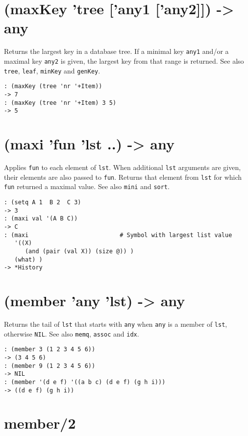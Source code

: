{{{{{{{ 
\section{(maxKey 'tree ['any1 ['any2]]) -> any}
\label{sec-8-1-13-18}


Returns the largest key in a database tree. If a minimal key \texttt{any1}
and/or a maximal key \texttt{any2} is given, the largest key from that range is
returned. See also \texttt{tree}, \texttt{leaf}, \texttt{minKey} and \texttt{genKey}.


\begin{verbatim}
: (maxKey (tree 'nr '+Item))
-> 7
: (maxKey (tree 'nr '+Item) 3 5)
-> 5
\end{verbatim}

 
\section{(maxi 'fun 'lst ..) -> any}
\label{sec-8-1-13-19}


Applies \texttt{fun} to each element of \texttt{lst}. When additional \texttt{lst} arguments
are given, their elements are also passed to \texttt{fun}. Returns that element
from \texttt{lst} for which \texttt{fun} returned a maximal value. See also \texttt{mini} and
\texttt{sort}.


\begin{verbatim}
: (setq A 1  B 2  C 3)
-> 3
: (maxi val '(A B C))
-> C
: (maxi                          # Symbol with largest list value
   '((X)
      (and (pair (val X)) (size @)) )
   (what) )
-> *History
\end{verbatim}

 
\section{(member 'any 'lst) -> any}
\label{sec-8-1-13-20}


Returns the tail of \texttt{lst} that starts with \texttt{any} when \texttt{any} is a member
of \texttt{lst}, otherwise \texttt{NIL}. See also \texttt{memq}, \texttt{assoc} and \texttt{idx}.


\begin{verbatim}
: (member 3 (1 2 3 4 5 6))
-> (3 4 5 6)
: (member 9 (1 2 3 4 5 6))
-> NIL
: (member '(d e f) '((a b c) (d e f) (g h i)))
-> ((d e f) (g h i))
\end{verbatim}

 
\section{member/2}
\label{sec-8-1-13-21}


}}}}}}}

